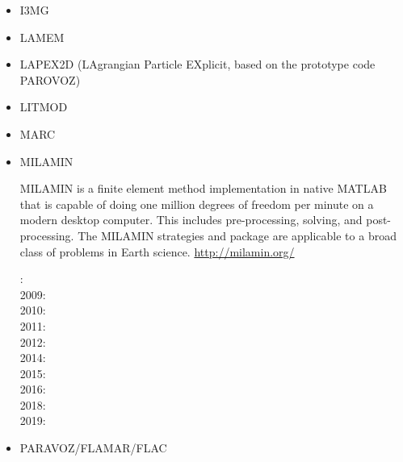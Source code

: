\begin{itemize}
\item I3MG
\cite{facc14}

\item LAMEM
\cite{scbe08}
\cite{kamm10}
\cite{lemk11}
\cite{may12}
\cite{lesh14}
\cite{cokm14}
\cite{bakp14}
\cite{feka14a}
\cite{feka14b}
\cite{puka15}
\cite{feka15}
\cite{cofk15}
\cite{kapb16}

\item LAPEX2D (LAgrangian Particle EXplicit, based on the prototype code PAROVOZ) 
\cite{sopg05}
\cite{bbeg06}\cite{basv06}
\cite{baso08}
\cite{scbe08}
\cite{sosk11}


\item LITMOD
\cite{afrf07}
\cite{affr08}
\cite{fuac09}
\cite{fufa10}


\item MARC
\cite{nesg97}
\cite{nesb99}


\item MILAMIN

MILAMIN is a finite element method implementation in native MATLAB that is capable of doing one million degrees of freedom per minute on a modern desktop computer. This includes pre-processing, solving, and post-processing. The MILAMIN strategies and package are applicable to a broad class of problems in Earth science. \url{http://milamin.org/}

: \cite{daks08}\\
2009: \cite{gogk09}\\
2010: \cite{krda10}\cite{kaus10}\\
2011: \cite{yakm11}\\
2012: \cite{gebk12}\\
2014: \cite{jobk14}\\
2015: \cite{lukz15}\cite{gehm15}\cite{thkp15}\cite{musd15}\\
2016: \cite{jads16}\cite{maka16}\\
2018: \cite{dusd18}\cite{jasc18}\cite{jadg18}\cite{comj18}\cite{jens18}\cite{rabw18}\cite{chsm18}\\
2019: \cite{anpa19}\cite{sifg19}\cite{baba19}


\item PARAVOZ/FLAMAR/FLAC


\end{itemize}
